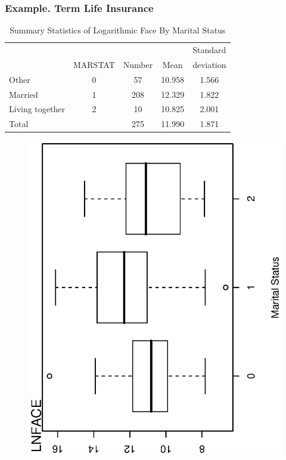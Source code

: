 \begin{frame}[shrink=10]
 \frametitle{Example. Term Life Insurance}
\begin{table}[h] \caption{Summary
Statistics of Logarithmic Face By Marital Status}
\begin{tabular}{lcccc}
\hline
&  &  &  & Standard \\
& MARSTAT & Number & Mean & deviation\\\hline
Other           & 0 & 57 & 10.958 & 1.566 \\
Married         & 1 & 208 & 12.329 & 1.822 \\
Living together & 2 & 10 & 10.825 & 2.001 \\ \hline
Total           &   & 275 & 11.990 & 1.871 \\
 \hline
\end{tabular}
\end{table}

\begin{figure}[htp]
  \begin{center}
    \includegraphics[width=1\textwidth,angle=270,scale=0.5]{Chapter4/F4BoxFACEMARSTAT.ps}
  \end{center}
\end{figure}

\end{frame}

